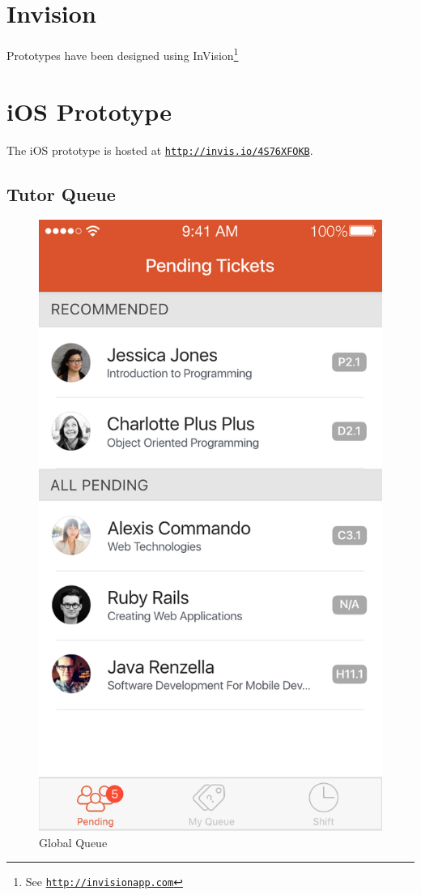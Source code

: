 \documentclass[a4paper,12pt]{article}
\date{}
\renewcommand{\href}[2]{#2\footnote{See \texttt{\url{#1}}}}
\begin{document}
{
\setcounter{tocdepth}{3}
\tableofcontents
\listoffigures
}
\newpage
\section{Invision}\label{invision}

Prototypes have been designed using
\href{http://invisionapp.com}{InVision}

\section{iOS Prototype}\label{ios-prototype}

The iOS prototype is hosted at \texttt{\url{http://invis.io/4S76XFOKB}}.

\subsection{Tutor Queue}\label{tutor-queue}

\begin{figure}[p]
\centering
\includegraphics[scale=0.5]{46d5415602.png}
\caption{Global Queue}
\label{1}
\end{figure}
\end{document}
